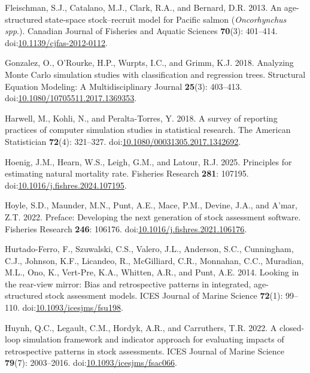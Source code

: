 \documentclass[
  12pt,
]{article}
\newlength{\cslhangindent}
\newenvironment{CSLReferences}[2] %
 {\begin{list}{}{%
  \setlength{\itemindent}{0pt}
  \setlength{\leftmargin}{0pt}
  \setlength{\parsep}{0pt}
  \ifodd #1
   \setlength{\leftmargin}{\cslhangindent}
   \setlength{\itemindent}{-1\cslhangindent}
  \fi
  \setlength{\itemsep}{#2\baselineskip}}}
 {\end{list}}
\begin{document}
\begin{CSLReferences}{1}{0}
Fleischman, S.J., Catalano, M.J., Clark, R.A., and Bernard, D.R. 2013.
An age-structured state-space stock--recruit model for {P}acific salmon
(\emph{{O}ncorhynchus spp}.). Canadian Journal of Fisheries and Aquatic
Sciences \textbf{70}(3): 401--414.
doi:\href{https://doi.org/10.1139/cjfas-2012-0112}{10.1139/cjfas-2012-0112}.

Gonzalez, O., O'Rourke, H.P., Wurpts, I.C., and Grimm, K.J. 2018.
Analyzing {M}onte {C}arlo simulation studies with classification and
regression trees. Structural Equation Modeling: A Multidisciplinary
Journal \textbf{25}(3): 403--413.
doi:\href{https://doi.org/10.1080/10705511.2017.1369353}{10.1080/10705511.2017.1369353}.

Harwell, M., Kohli, N., and Peralta-Torres, Y. 2018. A survey of
reporting practices of computer simulation studies in statistical
research. The American Statistician \textbf{72}(4): 321--327.
doi:\href{https://doi.org/10.1080/00031305.2017.1342692}{10.1080/00031305.2017.1342692}.

Hoenig, J.M., Hearn, W.S., Leigh, G.M., and Latour, R.J. 2025.
Principles for estimating natural mortality rate. Fisheries Research
\textbf{281}: 107195.
doi:\href{https://doi.org/10.1016/j.fishres.2024.107195}{10.1016/j.fishres.2024.107195}.

Hoyle, S.D., Maunder, M.N., Punt, A.E., Mace, P.M., Devine, J.A., and
A'mar, Z.T. 2022. Preface: Developing the next generation of stock
assessment software. Fisheries Research \textbf{246}: 106176.
doi:\href{https://doi.org/10.1016/j.fishres.2021.106176}{10.1016/j.fishres.2021.106176}.

Hurtado-Ferro, F., Szuwalski, C.S., Valero, J.L., Anderson, S.C.,
Cunningham, C.J., Johnson, K.F., Licandeo, R., McGilliard, C.R.,
Monnahan, C.C., Muradian, M.L., Ono, K., Vert-Pre, K.A., Whitten, A.R.,
and Punt, A.E. 2014. Looking in the rear-view mirror: Bias and
retrospective patterns in integrated, age-structured stock assessment
models. ICES Journal of Marine Science \textbf{72}(1): 99--110.
doi:\href{https://doi.org/10.1093/icesjms/fsu198}{10.1093/icesjms/fsu198}.

Huynh, Q.C., Legault, C.M., Hordyk, A.R., and Carruthers, T.R. 2022. A
closed-loop simulation framework and indicator approach for evaluating
impacts of retrospective patterns in stock assessments. ICES Journal of
Marine Science \textbf{79}(7): 2003--2016.
doi:\href{https://doi.org/10.1093/icesjms/fsac066}{10.1093/icesjms/fsac066}.


\end{CSLReferences}
\end{document}
